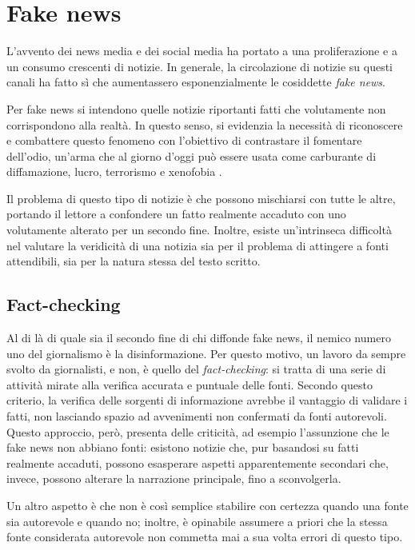 \documentclass[12pt]{report}
\theoremstyle{definition}
\begin{document}
\section{Fake news} \label{fakenews}
L'avvento dei news media e dei social media ha portato a una proliferazione e a un consumo crescenti di notizie.
In generale, la circolazione di notizie su questi canali ha fatto sì che aumentassero esponenzialmente le cosiddette \textit{fake news}.

Per fake news si intendono quelle notizie riportanti fatti che volutamente non corrispondono alla realtà.
In questo senso, si evidenzia la necessità di riconoscere e combattere questo fenomeno con l'obiettivo di contrastare il fomentare dell'odio, un'arma che al giorno d'oggi può essere usata come carburante di diffamazione, lucro, terrorismo e xenofobia \cite{4}.

Il problema di questo tipo di notizie è che possono mischiarsi con tutte le altre, portando il lettore a confondere un fatto realmente accaduto con uno volutamente alterato per un secondo fine.
Inoltre, esiste un'intrinseca difficoltà nel valutare la veridicità di una notizia sia per il problema di attingere a fonti attendibili, sia per la natura stessa del testo scritto.

\subsection{Fact-checking} \label{factchecking}
Al di là di quale sia il secondo fine di chi diffonde fake news, il nemico numero uno del giornalismo è la disinformazione.
Per questo motivo, un lavoro da sempre svolto da giornalisti, e non, è quello del \textit{fact-checking}: si tratta di una serie di attività mirate alla verifica accurata e puntuale delle fonti.
Secondo questo criterio, la verifica delle sorgenti di informazione avrebbe il vantaggio di validare i fatti, non lasciando spazio ad avvenimenti non confermati da fonti autorevoli.
Questo approccio, però, presenta delle criticità, ad esempio l'assunzione che le fake news non abbiano fonti: 
esistono notizie che, pur basandosi su fatti realmente accaduti, possono esasperare aspetti apparentemente secondari che, invece, possono alterare la narrazione principale, fino a sconvolgerla.

Un altro aspetto è che non è così semplice stabilire con certezza quando una fonte sia autorevole e quando no; inoltre, è opinabile assumere a priori che la stessa fonte considerata autorevole non commetta mai a sua volta errori di questo tipo.
\end{document}
